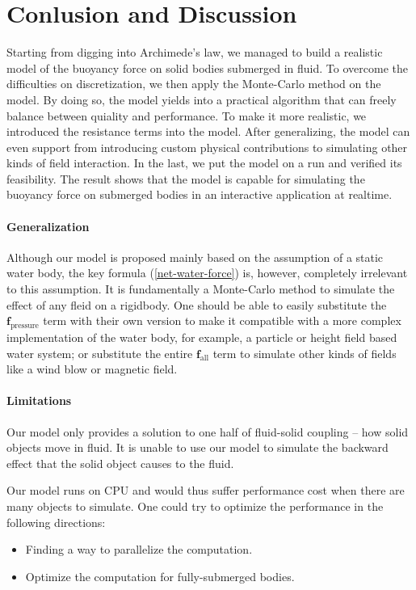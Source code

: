 \section{Conlusion and Discussion}

Starting from digging into Archimede's law, we managed to build a realistic model of the buoyancy force on solid bodies submerged in fluid.
To overcome the difficulties on discretization, we then apply the Monte-Carlo method on the model.
By doing so, the model yields into a practical algorithm that can freely balance between quiality and performance.
To make it more realistic, we introduced the resistance terms into the model.
After generalizing, the model can even support from introducing custom physical contributions to simulating other kinds of field interaction.
In the last, we put the model on a run and verified its feasibility.
The result shows that the model is capable for simulating the buoyancy force on submerged bodies in an interactive application at realtime.

\paragraph{Generalization}

Although our model is proposed mainly based on the assumption of a static water body,
the key formula (\ref{net-water-force}) is, however, completely irrelevant to this assumption.
It is fundamentally a Monte-Carlo method to simulate the effect of any fleid on a rigidbody.
One should be able to easily substitute the $\mathbf{f}_{\text{pressure}}$ term with their own version to make it compatible with a more complex implementation of the water body, for example, a particle or height field based water system; or substitute the entire $\mathbf{f}_{\text{all}}$ term to simulate other kinds of fields like a wind blow or magnetic field.

\paragraph{Limitations}

Our model only provides a solution to one half of fluid-solid coupling -- how solid objects move in fluid.
It is unable to use our model to simulate the backward effect that the solid object causes to the fluid.

Our model runs on CPU and would thus suffer performance cost when there are many objects to simulate.
One could try to optimize the performance in the following directions:
\begin{itemize}
	\item Finding a way to parallelize the computation.
	\item Optimize the computation for fully-submerged bodies.
\end{itemize}

